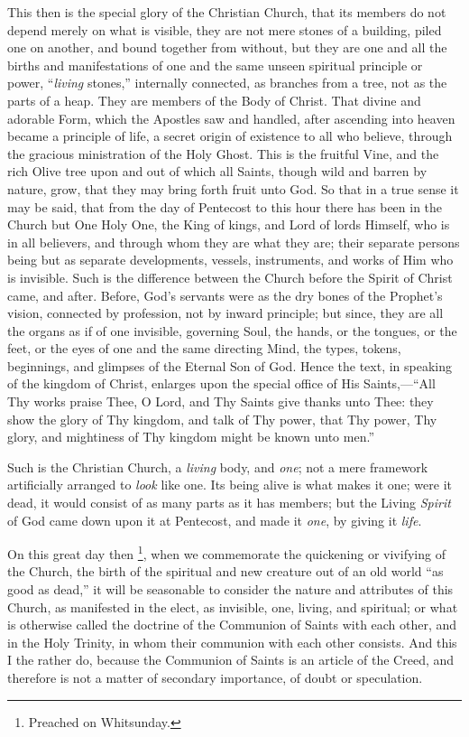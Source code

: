 This then is the special glory of the Christian Church, that its
members do not depend merely on what is visible, they are not mere
stones of a building, piled one on another, and bound together from
without, but they are one and all the births and manifestations of one
and the same unseen spiritual principle or power, ``\emph{living}
stones,'' internally connected, as branches from a tree, not as
the parts of a heap. They are members of the Body of Christ. That
divine and adorable Form, which the Apostles saw and handled, after
ascending into heaven became a principle of life, a secret origin of
existence to all who believe, through the gracious ministration of the
Holy Ghost. This is the fruitful Vine, and the rich Olive tree upon
and out of which all Saints, though wild and barren by nature, grow,
that they may bring forth fruit unto God. So that in a true sense it
may be said, that from the day of Pentecost to this hour there has
been in the Church but One Holy One, the King of kings, and Lord of
lords Himself, who is in all believers, and through whom they are what
they are; their separate persons being but as separate developments,
vessels, instruments, and works of Him who is invisible. Such is the
difference between the Church before the Spirit of Christ came, and
after. Before, God's servants were as the dry bones of the Prophet's
vision, connected by profession, not by inward principle; but since,
they are all the organs as if of one invisible, governing Soul, the
hands, or the tongues, or the feet, or the eyes of one and the same
directing Mind, the types, tokens, beginnings, and glimpses of the
Eternal Son of God. Hence the text, in speaking of the kingdom of
Christ, enlarges upon the special office of His Saints,—``All
Thy works praise Thee, O Lord, and Thy Saints give thanks unto Thee:
they show the glory of Thy kingdom, and talk of Thy power, that Thy
power, Thy glory, and mightiness of Thy kingdom might be known unto
men.''

Such is the Christian Church, a \emph{living} body, and \emph{one};
not a mere framework artificially arranged to \emph{look} like one.
Its being alive is what makes it one; were it dead, it would consist
of as many parts as it has members; but the Living \emph{Spirit} of
God came down upon it at Pentecost, and made it \emph{one}, by giving
it \emph{life}.

On this great day then \footnote{Preached on Whitsunday.},
when we commemorate the quickening or vivifying of the Church, the
birth of the spiritual and new creature out of an old world ``as
good as dead,'' it will be seasonable to consider the nature and
attributes of this Church, as manifested in the elect, as invisible,
one, living, and spiritual; or what is otherwise called the doctrine
of the Communion of Saints with each other, and in the Holy Trinity,
in whom their communion with each other consists. And this I the
rather do, because the Communion of Saints is an article of the Creed,
and therefore is not a matter of secondary importance, of doubt or
speculation.

